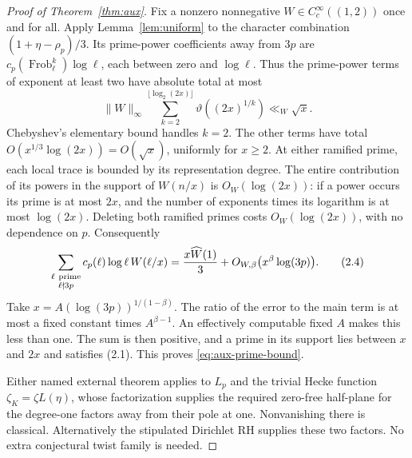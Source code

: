 \documentclass[11pt]{article}
\begin{document}
\begin{proof}[Proof of Theorem~\ref{thm:aux}]
Fix a nonzero nonnegative $W\in C_c^\infty((1,2))$ once and for all.
Apply Lemma~\ref{lem:uniform} to the character combination
$(1+\eta-\rho_p)/3$. Its prime-power coefficients away from $3p$
are $c_p(\operatorname{Frob}_\ell^k)\log\ell$, each between zero
and $\log\ell$. Thus the prime-power terms of exponent at least two
have absolute total at most
\[
 \|W\|_\infty\sum_{k=2}^{\lfloor\log_2(2x)\rfloor}
                  \vartheta((2x)^{1/k})\ll_W\sqrt x.              \tag{2.3}
\]
Chebyshev's elementary bound handles $k=2$. The other terms have
total $O(x^{1/3}\log(2x))=O(\sqrt x)$, uniformly
for $x\ge2$. At either ramified prime, each local trace is bounded
by its representation degree. The entire contribution of its
powers in the support of $W(n/x)$ is $O_W(\log(2x))$: if a power
occurs its prime is at most $2x$, and the number of exponents
times its logarithm is at most $\log(2x)$. Deleting both ramified
primes costs $O_W(\log(2x))$, with no dependence on $p$.
Consequently
\[
 \sum_{\substack{\ell\ {\rm prime}\\\ell\nmid3p}}
          c_p(\ell)\log\ell\,W(\ell/x)
 =\frac{x\widehat W(1)}3+
        O_{W,\beta}\bigl(x^\beta\log(3p)\bigr).                   \tag{2.4}
\]
Take $x=A(\log(3p))^{1/(1-\beta)}$.
The ratio of the error to the main term is at most a fixed
constant times $A^{\beta-1}$. An effectively computable fixed
$A$ makes this less than one. The sum is then positive, and a
prime in its support lies between $x$ and $2x$ and satisfies
(2.1). This proves \eqref{eq:aux-prime-bound}.

Either named external theorem applies to $L_p$ and the
trivial Hecke function $\zeta_K=\zeta L(\eta)$, whose factorization
supplies the required zero-free half-plane for the degree-one
factors away from their pole at one. Nonvanishing there is
classical. Alternatively the stipulated Dirichlet RH supplies
these two factors. No extra conjectural twist family is needed.
\end{proof}
\end{document}
